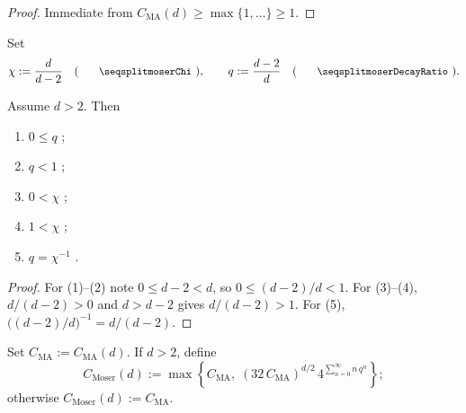 \begin{proof}
\leanok

Immediate from $C_{\mathrm{MA}}(d) \geq \max\{1,\dots\} \geq 1$.
\end{proof}

\begin{definition}
\label{def:moserChi}
\leanok
Set
\begin{equation*}
  \chi := \frac{d}{d-2} \quad (\text{\leanname{moserChi}}),
  \qquad
  q := \frac{d-2}{d} \quad (\text{\leanname{moserDecayRatio}}).
\end{equation*}
\end{definition}

\begin{lemma}
\label{lem:moserDecayRatio_nonneg}
\leanok
{}
Assume $d > 2$. Then
\begin{enumerate}
  \item $0 \leq q$ ;
  \item $q < 1$ ;
  \item $0 < \chi$ ;
  \item $1 < \chi$ ;
  \item $q = \chi^{-1}$ .
\end{enumerate}
\end{lemma}

\begin{proof}
\leanok

For (1)--(2) note $0 \leq d-2 < d$, so $0 \leq (d-2)/d < 1$.
For (3)--(4), $d/(d-2) > 0$ and $d > d-2$ gives $d/(d-2) > 1$.
For (5), $\big((d-2)/d\big)^{-1} = d/(d-2)$.
\end{proof}

\begin{definition}
\label{def:C_Moser}
\leanok
{}
Set $C_{\mathrm{MA}} := C_{\mathrm{MA}}(d)$. If $d > 2$, define
\begin{equation*}
  C_{\mathrm{Moser}}(d) := \max\!\left\{C_{\mathrm{MA}},\;
    (32\,C_{\mathrm{MA}})^{d/2}\,
    4^{\sum_{n=0}^{\infty} n\,q^{n}}\right\};
\end{equation*}
otherwise $C_{\mathrm{Moser}}(d) := C_{\mathrm{MA}}$.
\end{definition}

